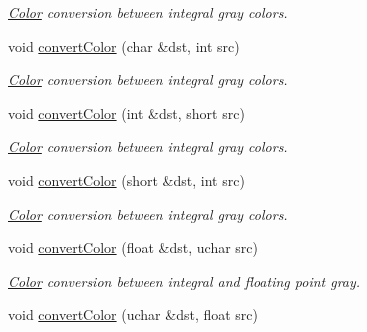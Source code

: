 \begin{DoxyCompactItemize}
\begin{DoxyCompactList}\small\item\em \hyperlink{class_d_o_1_1_color}{Color} conversion between integral gray colors. \end{DoxyCompactList}\item 
\hypertarget{group___color_conversion_gaed95c34a03689a19d0fb4b3402a4f663}{void \hyperlink{group___color_conversion_gaed95c34a03689a19d0fb4b3402a4f663}{convert\-Color} (char \&dst, int src)}\label{group___color_conversion_gaed95c34a03689a19d0fb4b3402a4f663}

\begin{DoxyCompactList}\small\item\em \hyperlink{class_d_o_1_1_color}{Color} conversion between integral gray colors. \end{DoxyCompactList}\item 
\hypertarget{group___color_conversion_ga74c347b60b2f8f89d49e8edf95bc256c}{void \hyperlink{group___color_conversion_ga74c347b60b2f8f89d49e8edf95bc256c}{convert\-Color} (int \&dst, short src)}\label{group___color_conversion_ga74c347b60b2f8f89d49e8edf95bc256c}

\begin{DoxyCompactList}\small\item\em \hyperlink{class_d_o_1_1_color}{Color} conversion between integral gray colors. \end{DoxyCompactList}\item 
\hypertarget{group___color_conversion_ga2886b206c1b6cdaeb4ca77afef11c49f}{void \hyperlink{group___color_conversion_ga2886b206c1b6cdaeb4ca77afef11c49f}{convert\-Color} (short \&dst, int src)}\label{group___color_conversion_ga2886b206c1b6cdaeb4ca77afef11c49f}

\begin{DoxyCompactList}\small\item\em \hyperlink{class_d_o_1_1_color}{Color} conversion between integral gray colors. \end{DoxyCompactList}\item 
\hypertarget{group___color_conversion_gacdd167431700fa7e3262bd0cd0505512}{void \hyperlink{group___color_conversion_gacdd167431700fa7e3262bd0cd0505512}{convert\-Color} (float \&dst, uchar src)}\label{group___color_conversion_gacdd167431700fa7e3262bd0cd0505512}

\begin{DoxyCompactList}\small\item\em \hyperlink{class_d_o_1_1_color}{Color} conversion between integral and floating point gray. \end{DoxyCompactList}\item 
\hypertarget{group___color_conversion_ga4c458acc6b6b19eff6e85750fc53379e}{void \hyperlink{group___color_conversion_ga4c458acc6b6b19eff6e85750fc53379e}{convert\-Color} (uchar \&dst, float src)}\label{group___color_conversion_ga4c458acc6b6b19eff6e85750fc53379e}


\end{DoxyCompactItemize}

